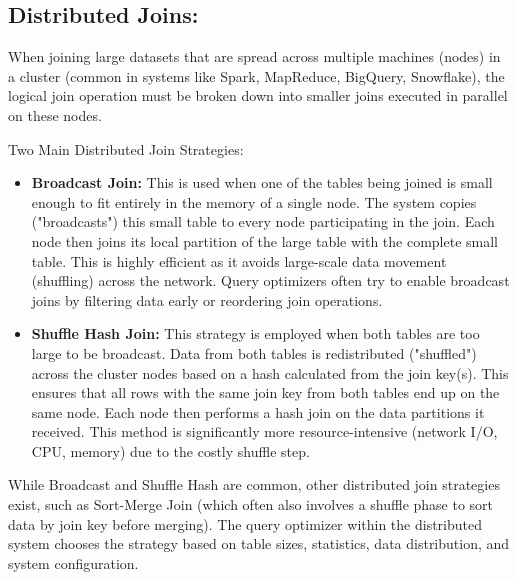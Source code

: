 



\subsection*{Distributed Joins:}
When joining large datasets that are spread across multiple
machines (nodes) in a cluster (common in systems like Spark,
MapReduce, BigQuery, Snowflake), the logical join operation
must be broken down into smaller joins executed in
parallel on these nodes.

Two Main Distributed Join Strategies: 
\begin{itemize}
    \item \textbf{Broadcast Join:} This is used when one of
    the tables being joined is small enough to fit entirely
    in the memory of a single node. The system copies
    ("broadcasts") this small table to every node
    participating in the join. Each node then joins its
    local partition of the large table with the complete
    small table. This is highly efficient as it avoids
    large-scale data movement (shuffling) across the network.
    Query optimizers often try to enable broadcast joins by
    filtering data early or reordering join operations.

    \item \textbf{Shuffle Hash Join:} This strategy is
    employed when both tables are too large to be broadcast.
    Data from both tables is redistributed ("shuffled")
    across the cluster nodes based on a hash calculated
    from the join key(s). This ensures that all rows with
    the same join key from both tables end up on the same
    node. Each node then performs a hash join on the data
    partitions it received. This method is significantly
    more resource-intensive (network I/O, CPU, memory) due
    to the costly shuffle step.
\end{itemize}
While Broadcast and Shuffle Hash are common, other distributed
join strategies exist, such as Sort-Merge Join
(which often also involves a shuffle phase to sort data by join
key before merging). The query optimizer within the distributed
system chooses the strategy based on table sizes, statistics,
data distribution, and system configuration.

